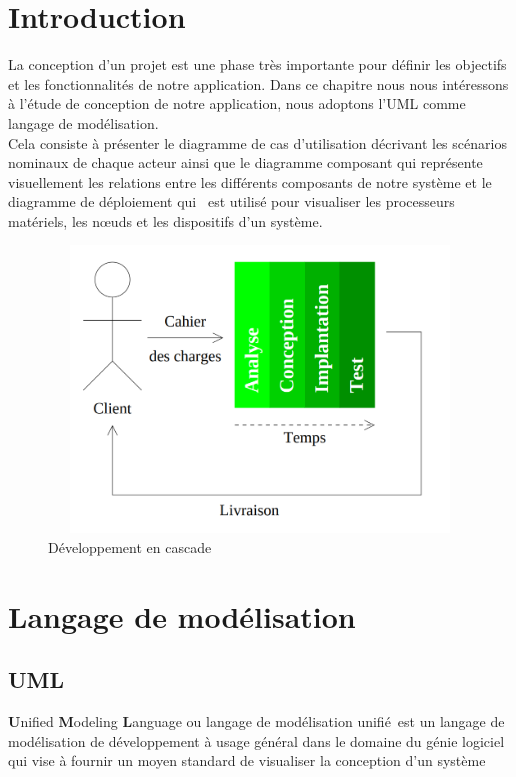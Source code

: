 \documentclass[12pt]{report}
\begin{document}
\newpage

\section{Introduction}
La conception d’un projet est une phase très importante pour définir les objectifs et les fonctionnalités de notre application. Dans ce chapitre nous nous intéressons à l’étude de conception de notre application, nous adoptons l’UML comme langage de modélisation.
\\
Cela consiste à présenter le diagramme de cas d’utilisation décrivant les scénarios nominaux de chaque acteur ainsi que le diagramme composant qui représente visuellement les relations entre les différents composants de notre système et le diagramme de déploiement qui  est utilisé pour visualiser les processeurs matériels, les nœuds et les dispositifs d’un système.

\vspace{0.1in}

\begin{figure}[h]
\centering
    \includegraphics[width = 5in, height = 3in]{../images/analyse_conception.png}
\caption{Développement en cascade}
\end{figure}


\section{Langage de modélisation}
\subsection{UML}
\vspace{0.1in}
\textbf{U}nified \textbf{M}odeling \textbf{L}anguage ou langage de modélisation unifié est un langage de modélisation de développement à usage général dans le domaine du génie logiciel qui vise à fournir un moyen standard de visualiser la conception d’un système
\end{document}
